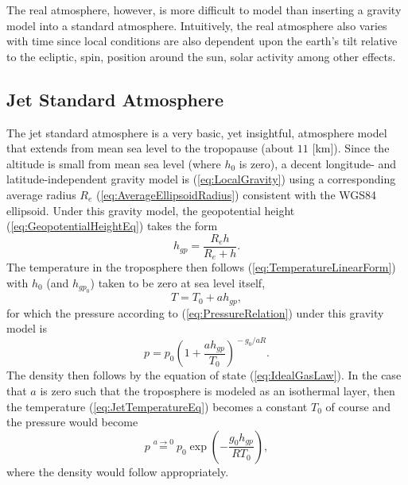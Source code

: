 \documentclass[11pt,dvipsnames]{thesis}
\begin{document}
The real atmosphere, however, is more difficult to model than inserting a gravity model into a standard atmosphere. Intuitively, the real atmosphere also varies with time since local conditions are also dependent upon the earth's tilt relative to the ecliptic, spin, position around the sun, solar activity among other effects.




\subsection{Jet Standard Atmosphere}
The jet standard atmosphere is a very basic, yet insightful, atmosphere model that extends from mean sea level to the tropopause (about $11$ [\si{\km}]). 
Since the altitude is small from mean sea level (where $h_0$ is zero), a decent longitude- and latitude-independent gravity model is (\ref{eq:LocalGravity}) using a corresponding average radius $R_e$ (\ref{eq:AverageEllipsoidRadius}) consistent with the WGS84 ellipsoid. 
Under this gravity model, the geopotential height (\ref{eq:GeopotentialHeightEq}) takes the form
\begin{equation}
h_{gp} = \frac{R_e h}{R_e + h}.
\end{equation}
The temperature in the troposphere then follows (\ref{eq:TemperatureLinearForm}) with $h_0$ (and $h_{gp_0}$) taken to be zero at sea level itself,
\begin{equation}
T = T_0 + a h_{gp}, \label{eq:JetTemperatureEq}
\end{equation}
for which the pressure according to (\ref{eq:PressureRelation}) under this gravity model is
\begin{equation}
p = p_0 \left(1 + \frac{a h_{gp}}{T_0}\right)^{\!-g_0 / a R}. \label{eq:JetPressureEq}
\end{equation}
The density then follows by the equation of state (\ref{eq:IdealGasLaw}).
In the case that $a$ is zero such that the troposphere is modeled as an isothermal layer, then the temperature (\ref{eq:JetTemperatureEq}) becomes a constant $T_0$ of course and the pressure would become
\begin{equation}
p \overset{a \to 0}{=} p_0 \exp\!\left(-\frac{g_0 h_{gp}}{R T_0}\right),
\end{equation}
where the density would follow appropriately. 
\end{document}
